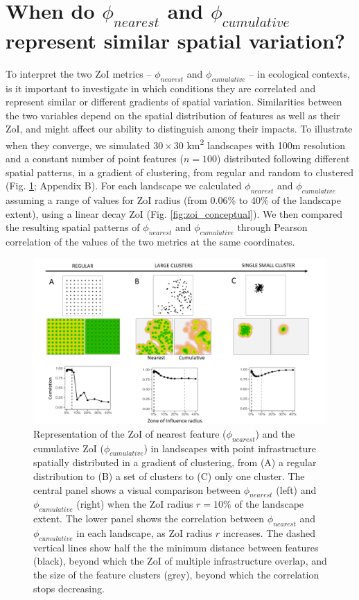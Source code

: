 \documentclass[titlepage]{article}
\begin{document}
\section{When do $\phi_{nearest}$ and $\phi_{cumulative}$ represent similar spatial variation?}

To interpret the two ZoI metrics -- $\phi_{nearest}$ and $\phi_{cumulative}$ -- in ecological contexts, is it important to investigate in which conditions they are correlated and represent similar or different gradients of spatial variation. Similarities between the two variables depend on the spatial distribution of features as well as their ZoI, and might affect our ability to distinguish among their impacts. To illustrate when they converge, we simulated $30 \times 30$ km\textsuperscript{2} landscapes with 100m resolution and a constant number of point features ($n = 100$) distributed following different spatial patterns, in a gradient of clustering, from regular and random to clustered (Fig. \ref{fig:simulated_landscapes}; Appendix B). For each landscape we calculated $\phi_{nearest}$ and $\phi_{cumulative}$ assuming a range of values for ZoI radius (from 0.06\% to 40\% of the landscape extent), using a linear decay ZoI (Fig. \ref{fig:zoi_conceptual}). We then compared the resulting spatial patterns of $\phi_{nearest}$ and $\phi_{cumulative}$ through Pearson correlation of the values of the two metrics at the same coordinates. 

\begin{figure}[h]
\centering
\includegraphics[width=1.3\textwidth,center]{figures/simulated_landscapes.png}
\caption{\label{fig:simulated_landscapes} Representation of the ZoI of nearest feature ($\phi_{nearest}$) and the cumulative ZoI ($\phi_{cumulative}$) in landscapes with point infrastructure spatially distributed in a gradient of clustering, from (A) a regular distribution to (B) a set of clusters to (C) only one cluster. 
The central panel shows a visual comparison between $\phi_{nearest}$ (left) and $\phi_{cumulative}$ (right) when the ZoI radius $r = 10\%$ of the landscape extent. The lower panel shows the correlation between $\phi_{nearest}$ and $\phi_{cumulative}$ in each landscape, as ZoI radius $r$ increases. The dashed vertical lines show half the the minimum distance between features (black), beyond which the ZoI of multiple infrastructure overlap, and the size of the feature clusters (grey), beyond which the correlation stops decreasing.}
\end{figure}
\end{document}
